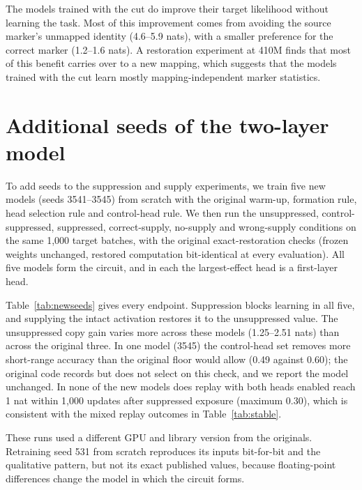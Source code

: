The models trained with the cut do improve their target likelihood without learning
the task. Most of this improvement comes from avoiding the source marker's unmapped
identity (4.6--5.9 nats), with a smaller preference for the correct marker
(1.2--1.6 nats). A restoration experiment at 410M finds that most of this benefit
carries over to a new mapping, which suggests that the models trained with the cut
learn mostly mapping-independent marker statistics.

\section{Additional seeds of the two-layer model}
\label{app:newseeds}
To add seeds to the suppression and supply experiments, we train five new models
(seeds 3541--3545) from scratch with the original warm-up, formation rule, head
selection rule and control-head rule. We then run the unsuppressed,
control-suppressed, suppressed, correct-supply, no-supply and wrong-supply
conditions on the same 1,000 target batches, with the original exact-restoration
checks (frozen weights unchanged, restored computation bit-identical at every
evaluation). All five models form the circuit, and in each the largest-effect head
is a first-layer head.

Table~\ref{tab:newseeds} gives every endpoint. Suppression blocks learning in all
five, and supplying the intact activation restores it to the unsuppressed value.
The unsuppressed copy gain varies more across these models (1.25--2.51 nats) than
across the original three. In one model (3545) the control-head set removes more
short-range accuracy than the original floor would allow (0.49 against 0.60); the
original code records but does not select on this check, and we report the model
unchanged. In none of the new models does replay with both heads enabled reach
1 nat within 1,000 updates after suppressed exposure (maximum 0.30), which is
consistent with the mixed replay outcomes in Table~\ref{tab:stable}.

These runs used a different GPU and library version from the originals. Retraining
seed 531 from scratch reproduces its inputs bit-for-bit and the qualitative
pattern, but not its exact published values, because floating-point differences
change the model in which the circuit forms.

\begin{table}[!htbp]\centering\scriptsize
\caption{Five additional seeds of the two-layer model: copy gain (nats) / distance-64
accuracy after 1,000 target updates. \emph{Replay} is copy gain after 1,000 further
updates of replay with both heads enabled, following suppressed exposure.}
\label{tab:newseeds}
\setlength{\tabcolsep}{2.5pt}
\end{table}

